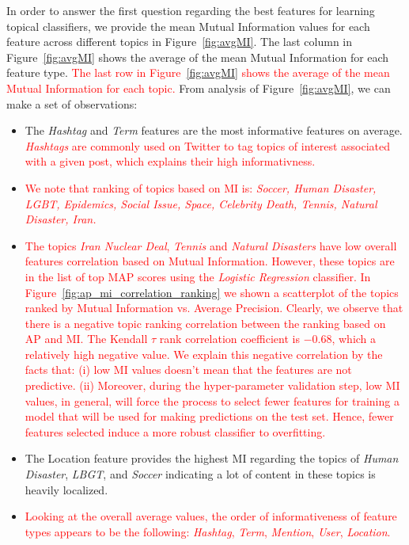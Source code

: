 In order to answer the first question regarding the best features
for learning topical classifiers, we provide the mean Mutual Information
values for each feature across different topics in Figure~\ref{fig:avgMI}.
The last column in Figure~\ref{fig:avgMI} shows the
average of the mean Mutual Information for each feature type. \textcolor{red}{ The last row in Figure~\ref{fig:avgMI} shows the
average of the mean Mutual Information for each topic.} From analysis of
Figure~\ref{fig:avgMI}, we can make a set of observations:
\begin{itemize}
\item The \textit{Hashtag} and \textit{Term} features are the most informative features on average. \textcolor{red}{ \textit{Hashtags} are commonly used on Twitter to tag topics of interest associated with a given post, which explains their high informativness.}


\item  \textcolor{red}{We note that ranking of topics based on MI is: \emph{Soccer, Human Disaster, LGBT, Epidemics, Social Issue, Space, Celebrity Death, Tennis, Natural Disaster, Iran.}}

\item \textcolor{red}{The topics \textit{Iran Nuclear Deal}, \textit{Tennis} and \textit{Natural Disasters} have low overall features correlation based on Mutual Information. However, these topics  are in the list of top MAP scores using the \textit{Logistic Regression} classifier. In Figure~\ref{fig:ap_mi_correlation_ranking} we shown a scatterplot of the topics ranked by Mutual Information vs. Average Precision. Clearly, we observe that there is a negative topic ranking correlation between the ranking based on AP and MI. The Kendall $\tau$  rank correlation coefficient is $-0.68$, which a relatively high negative value. We explain this negative correlation by the facts that: (i) low MI values doesn't mean that the features are not predictive. (ii) Moreover, during the hyper-parameter validation step, low MI values, in general, will force the process to select fewer features for training a model that will be used for making predictions on the test set. Hence, fewer features selected induce a more robust classifier to overfitting.}

\item The Location feature provides the highest MI regarding the topics of \textit{Human Disaster}, \textit{LBGT}, and \textit{Soccer} indicating a lot of content in these topics is heavily localized. 


\item \textcolor{red}{ Looking at the overall average values, the order of informativeness of feature types appears to be the following: \textit{Hashtag}, \textit{Term}, \textit{Mention}, \textit{User}, \textit{Location}.}
\end{itemize}





